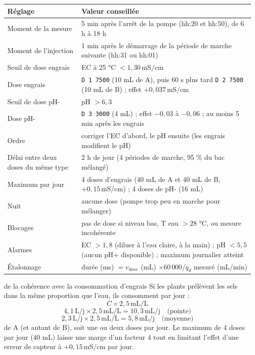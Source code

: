 \documentclass[11pt,a4paper]{article}
\newcommand{\U}[1]{\,\mathrm{#1}}
\begin{document}
\begin{center}
\begin{tabular}{>{\raggedright}p{5.3cm}p{8.3cm}}
\toprule
\textbf{Réglage} & \textbf{Valeur conseillée} \\
\midrule
Moment de la mesure & 5 min après l'arrêt de la pompe (hh:20 et hh:50), de 6 h à 18 h \\
Moment de l'injection & 1 min après le démarrage de la période de marche suivante (hh:31 ou hh:01) \\
Seuil de dose engrais & EC à 25 °C $< 1{,}30\U{mS/cm}$ \\
Dose engrais & \texttt{D 1 7500} (10 mL de A), puis 60 s plus tard \texttt{D 2 7500} (10 mL de B) ; effet $+0{,}037\U{mS/cm}$ \\
Seuil de dose pH- & pH $> 6{,}3$ \\
Dose pH- & \texttt{D 3 3000} (4 mL) ; effet $-0{,}03$ à $-0{,}06$ ; au moins 5 min après les engrais \\
Ordre & corriger l'EC d'abord, le pH ensuite (les engrais modifient le pH) \\
Délai entre deux doses du même type & 2 h de jour (4 périodes de marche, 95 \% du bac mélangé) \\
Maximum par jour & 4 doses d'engrais (40 mL de A et 40 mL de B, $+0{,}15\U{mS/cm}$) ; 4 doses de pH- (16 mL) \\
Nuit & aucune dose (pompe trop peu en marche pour mélanger) \\
Blocages & pas de dose si niveau bas, T eau $> 28$ °C, ou mesure incohérente \\
Alarmes & EC $> 1{,}8$ (diluer à l'eau claire, à la main) ; pH $< 5{,}5$ (aucun pH+ disponible) ; maximum journalier atteint \\
Étalonnage & durée (ms) $= v_{dose}$ (mL) $\times 60\,000 / q_d$ mesuré (mL/min) \\
\bottomrule
\end{tabular}
\end{center}

\begin{calcul}{de la cohérence avec la consommation d'engrais}
Si les plants prélèvent les sels dans la même proportion que l'eau, ils consomment par jour :
\[ C\times2{,}5\U{mL/L} \]
\[ 4{,}1\U{L/j}\times2{,}5\U{mL/L} = 10{,}3\U{mL/j} \quad\text{(pointe)} \]
\[ 2{,}3\U{L/j}\times2{,}5\U{mL/L} = 5{,}8\U{mL/j} \quad\text{(moyenne)} \]
de A (et autant de B), soit une ou deux doses par jour. Le maximum de 4 doses par jour (40 mL) laisse une marge d'un facteur 4 tout en limitant l'effet d'une erreur de capteur à $+0{,}15\U{mS/cm}$ par jour.
\end{calcul}
\end{document}
